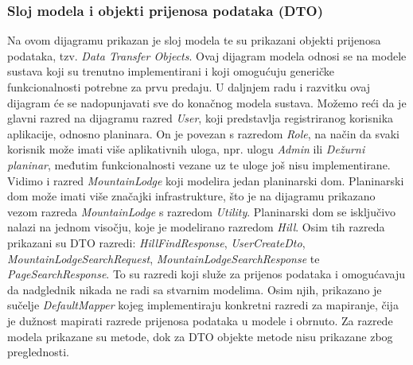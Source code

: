 			\subsubsection{Sloj modela i objekti prijenosa podataka (DTO)}
			Na ovom dijagramu prikazan je sloj modela te su prikazani objekti prijenosa podataka, tzv. \textit{Data Transfer Objects}. Ovaj dijagram modela odnosi se na modele sustava koji su trenutno implementirani i koji omogućuju generičke funkcionalnosti potrebne za prvu predaju. U daljnjem radu i razvitku ovaj dijagram će se nadopunjavati sve do konačnog modela sustava. Možemo reći da je glavni razred na dijagramu razred \textit{User}, koji predstavlja registriranog korisnika aplikacije, odnosno planinara. On je povezan s razredom \textit{Role}, na način da svaki korisnik može imati više aplikativnih uloga, npr. ulogu \textit{Admin} ili \textit{Dežurni planinar}, međutim funkcionalnosti vezane uz te uloge još nisu implementirane. Vidimo i razred \textit{MountainLodge} koji modelira jedan planinarski dom. Planinarski dom može imati više značajki infrastrukture, što je na dijagramu prikazano vezom razreda \textit{MountainLodge} s razredom \textit{Utility}. Planinarski dom se isključivo nalazi na jednom visočju, koje je modelirano razredom \textit{Hill}. Osim tih razreda prikazani su DTO razredi: \textit{HillFindResponse}, \textit{UserCreateDto}, \textit{MountainLodgeSearchRequest}, \textit{MountainLodgeSearchResponse} te \textit{PageSearchResponse}. To su razredi koji služe za prijenos podataka i omogućavaju da nadglednik nikada ne radi sa stvarnim modelima. Osim njih, prikazano je sučelje \textit{DefaultMapper} kojeg implementiraju konkretni razredi za mapiranje, čija je dužnost mapirati razrede prijenosa podataka u modele i obrnuto. Za razrede modela prikazane su metode, dok za DTO objekte metode nisu prikazane zbog preglednosti.
